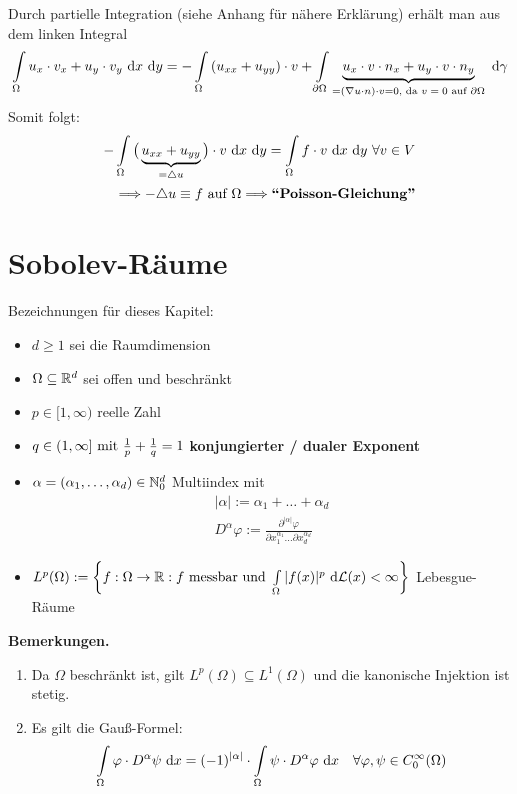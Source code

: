 Durch partielle Integration (siehe Anhang für nähere Erklärung) erhält man aus dem linken Integral
\begin{align*}
\int\limits_\Omega u_x\cdot v_x+u_y\cdot v_y\d x\d y
=-\int\limits_\Omega\left(u_{xx}+u_{yy}\right)\cdot v
+\int\limits_{\partial\Omega}\underbrace{u_x\cdot v\cdot n_x+u_y\cdot v\cdot n_y}_{=(\nabla u\cdot n)\cdot v=0\text{, da $v=0$ auf }\partial\Omega}\d\gamma
\end{align*}
Somit folgt:
\begin{align*}
-\int\limits_\Omega\big(\underbrace{u_{xx}+u_{yy}}_{=\laplace u}\big)\cdot v\d x\d y=\int\limits_\Omega f\cdot v\d x\d y~\forall v\in V\\
\Longrightarrow-\laplace u\equiv f\text{ auf }\Omega\Longrightarrow\textbf{``Poisson-Gleichung''}
\end{align*}

\section{Sobolev-Räume}
Bezeichnungen für dieses Kapitel:

\begin{itemize}
\item $d\geq1$ sei die Raumdimension
\item $\Omega\subseteq\R^d$ sei offen und beschränkt
\item $p\in[1,\infty)$ reelle Zahl
\item $q\in(1,\infty]\mit\frac{1}{p}+\frac{1}{q}=1$ \textbf{konjungierter / dualer Exponent}
\item $\alpha=(\alpha_1,\ldots,\alpha_d)\in\N_0^d$ Multiindex mit
\begin{align*}
|\alpha|:=\alpha_1+\ldots+\alpha_d\\
D^\alpha\varphi:=\frac{\partial^{|\alpha|}\varphi}{\partial x_1^{\alpha_1}\hdots\partial x_d^{\alpha_d}}
\end{align*}
\item $L^p(\Omega):=\left\lbrace f:\Omega\to\R:f\text{ messbar und }\int\limits_\Omega |f(x)|^p\d\mathcal{L}(x)<\infty\right\rbrace$ Lebesgue-Räume
\end{itemize}

\textbf{Bemerkungen.}
\begin{enumerate}
\item Da $\Omega$ beschränkt ist, gilt $L^p(\Omega)\subseteq L^1(\Omega)$ und die kanonische Injektion ist stetig.
\item Es gilt die Gauß-Formel:
\begin{align}\label{GaussFormel}
\int\limits_\Omega\varphi\cdot D^\alpha\psi\d x=(-1)^{|\alpha|}\cdot\int\limits_\Omega\psi\cdot D^\alpha\varphi\d x~~~\forall \varphi,\psi\in C_0^\infty(\Omega)
\end{align}
\end{enumerate}

